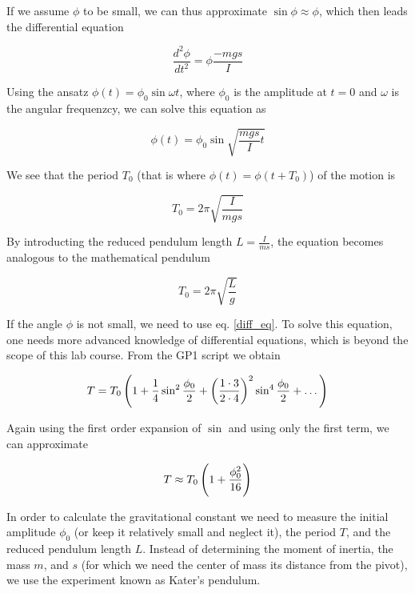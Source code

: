 \documentclass[a4paper,german,12pt,smallheadings]{scrartcl}
\begin{document}
If we assume $\phi$ to be small, we can thus approximate $\sin \phi \approx
\phi$, which then leads the differential equation

\begin{equation}
  \frac{d^2 \phi}{d t^2} = \phi \frac{-mgs}{I}
\end{equation}

Using the ansatz $\phi(t) = \phi_0 \sin \omega t$, where $\phi_0$ is the
amplitude at $t=0$ and $\omega$ is the angular frequenzcy, we can solve this
equation as

\begin{equation}
  \phi(t) = \phi_0 \sin \sqrt{\frac{mgs}{I} t}
\end{equation}

We see that the period $T_0$ (that is where $\phi(t) = \phi(t + T_0)$) of the motion is

\begin{equation}
  T_0 = 2 \pi \sqrt{\frac{I}{mgs}}
  \label{period}
\end{equation}

By introducting the reduced pendulum length $L = \frac{I}{ms}$, the
equation becomes analogous to the mathematical pendulum

\begin{equation}
  T_0 = 2 \pi \sqrt{\frac{L}{g}}
\end{equation}


If the angle $\phi$ is not small, we need to use eq. \ref{diff_eq}. To solve
this equation, one needs more advanced knowledge of differential equations,
which is beyond the scope of this lab course. From the GP1 script we obtain

\begin{equation}
  T = T_0 \del{1 + \frac{1}{4} \sin^2 \frac{\phi_0}{2} + \del{\frac{1 \cdot 3}{2 \cdot 4}}^2 \sin^4 \frac{\phi_0}{2} + \dots}
\end{equation}

Again using the first order expansion of $\sin$ and using only the first term, we can approximate

\begin{equation}
  T \approx T_0 \del{1 + \frac{\phi_0^2}{16}}
\end{equation}

In order to calculate the gravitational constant we need to measure the initial
amplitude $\phi_0$ (or keep it relatively small and neglect it), the period
$T$, and the reduced pendulum length $L$. Instead of determining the moment of
inertia, the mass $m$, and $s$ (for which we need the center of mass its
distance from the pivot), we use the experiment known as Kater's pendulum.
\end{document}
